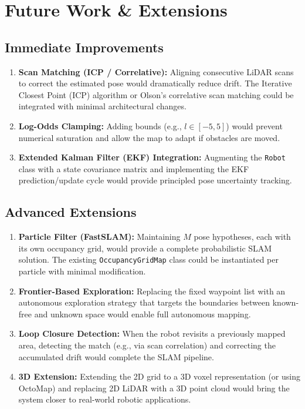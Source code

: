 \documentclass[12pt,a4paper]{article}
\begin{document}
\section{Future Work \& Extensions}

\subsection{Immediate Improvements}

\begin{enumerate}
    \item \textbf{Scan Matching (ICP / Correlative):} Aligning consecutive LiDAR scans to correct the estimated pose would dramatically reduce drift. The Iterative Closest Point (ICP) algorithm or Olson's correlative scan matching could be integrated with minimal architectural changes.

    \item \textbf{Log-Odds Clamping:} Adding bounds (e.g., \(l \in [-5, 5]\)) would prevent numerical saturation and allow the map to adapt if obstacles are moved.

    \item \textbf{Extended Kalman Filter (EKF) Integration:} Augmenting the \texttt{Robot} class with a state covariance matrix and implementing the EKF prediction/update cycle would provide principled pose uncertainty tracking.
\end{enumerate}

\subsection{Advanced Extensions}

\begin{enumerate}[resume]
    \item \textbf{Particle Filter (FastSLAM):} Maintaining \(M\) pose hypotheses, each with its own occupancy grid, would provide a complete probabilistic SLAM solution. The existing \texttt{OccupancyGridMap} class could be instantiated per particle with minimal modification.

    \item \textbf{Frontier-Based Exploration:} Replacing the fixed waypoint list with an autonomous exploration strategy that targets the boundaries between known-free and unknown space would enable full autonomous mapping.

    \item \textbf{Loop Closure Detection:} When the robot revisits a previously mapped area, detecting the match (e.g., via scan correlation) and correcting the accumulated drift would complete the SLAM pipeline.

    \item \textbf{3D Extension:} Extending the 2D grid to a 3D voxel representation (or using OctoMap) and replacing 2D LiDAR with a 3D point cloud would bring the system closer to real-world robotic applications.
\end{enumerate}
\end{document}
